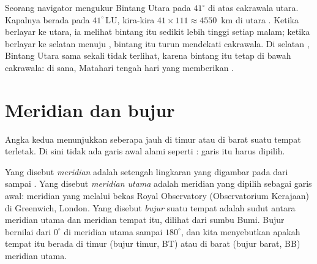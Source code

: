 \begin{example}\label{ex:g6:latitude-longitude:pole-star}
Seorang navigator mengukur Bintang Utara pada $41^\circ$ di atas cakrawala
utara. Kapalnya berada pada  $41^\circ$\,LU, kira-kira $41 \times 111
\approx \num{4550}$~km di utara . Ketika berlayar ke utara, ia
melihat bintang itu sedikit lebih tinggi setiap malam; ketika berlayar ke
selatan menuju , bintang itu turun mendekati cakrawala. Di
selatan , Bintang Utara sama sekali tidak terlihat, karena
bintang itu tetap di bawah cakrawala: di sana, Matahari tengah hari yang
memberikan .
\end{example}

\section{Meridian dan bujur}

Angka kedua menunjukkan seberapa jauh di timur atau di barat suatu tempat
terletak. Di sini tidak ada garis awal alami seperti : garis
itu harus dipilih.

\begin{definition}\label{def:g6:latitude-longitude:longitude}
Yang disebut \emph{meridian} adalah setengah lingkaran yang
digambar pada  dari  sampai . Yang disebut
\emph{meridian utama} adalah meridian yang dipilih
sebagai garis awal: meridian yang melalui bekas Royal Observatory (Observatorium
Kerajaan) di Greenwich, London. Yang disebut \emph{bujur} suatu
tempat adalah sudut antara meridian utama dan meridian tempat itu, dilihat
dari sumbu Bumi. Bujur bernilai dari $0^\circ$ di meridian utama sampai
$180^\circ$, dan kita menyebutkan apakah tempat itu berada di timur (bujur
timur, BT) atau di barat (bujur barat, BB) meridian utama.
\end{definition}

